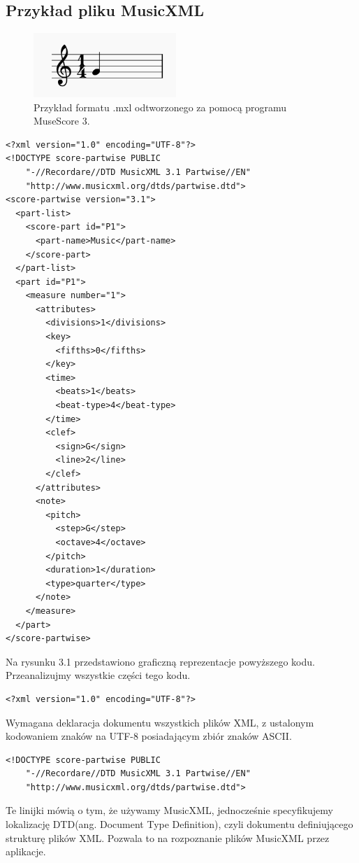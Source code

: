 \documentclass[printmode, eng]{mgr}
\newcommand\tab[1][1cm]{\hspace*{#1}}
\begin{document}
\subsection{Przykład pliku MusicXML}
\begin{figure}[!htb]
\centering
\includegraphics[width=5.4cm]{xml_example}
\caption{Przykład formatu .mxl odtworzonego za pomocą programu MuseScore 3.}
\end{figure}
\begin{lstlisting}
<?xml version="1.0" encoding="UTF-8"?>
<!DOCTYPE score-partwise PUBLIC
    "-//Recordare//DTD MusicXML 3.1 Partwise//EN"
    "http://www.musicxml.org/dtds/partwise.dtd">
<score-partwise version="3.1">
  <part-list>
    <score-part id="P1">
      <part-name>Music</part-name>
    </score-part>
  </part-list>
  <part id="P1">
    <measure number="1">
      <attributes>
        <divisions>1</divisions>
        <key>
          <fifths>0</fifths>
        </key>
        <time>
          <beats>1</beats>
          <beat-type>4</beat-type>
        </time>
        <clef>
          <sign>G</sign>
          <line>2</line>
        </clef>
      </attributes>
      <note>
        <pitch>
          <step>G</step>
          <octave>4</octave>
        </pitch>
        <duration>1</duration>
        <type>quarter</type>
      </note>
    </measure>
  </part>
</score-partwise>
\end{lstlisting}

\tab Na rysunku 3.1 przedstawiono graficzną reprezentacje powyższego kodu. Przeanalizujmy wszystkie części tego kodu.
 
\begin{lstlisting}
<?xml version="1.0" encoding="UTF-8"?>
\end{lstlisting}
Wymagana deklaracja dokumentu wszystkich plików XML, z ustalonym kodowaniem znaków na UTF-8 posiadającym zbiór znaków ASCII.

\begin{lstlisting}
<!DOCTYPE score-partwise PUBLIC
    "-//Recordare//DTD MusicXML 3.1 Partwise//EN"
    "http://www.musicxml.org/dtds/partwise.dtd">
\end{lstlisting}
Te linijki mówią o tym, że używamy MusicXML, jednocześnie specyfikujemy lokalizację DTD(ang. Document Type Definition), czyli dokumentu definiującego strukturę plików XML. Pozwala to na rozpoznanie plików MusicXML przez aplikacje.
\end{document}
